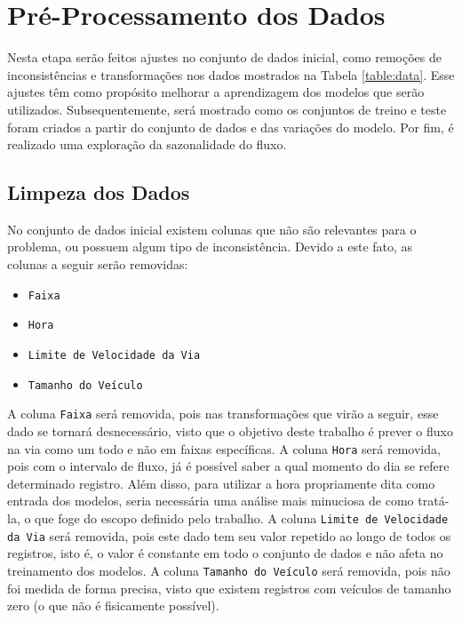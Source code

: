 \section{Pré-Processamento dos Dados}

Nesta etapa serão feitos ajustes no conjunto de dados inicial, como remoções de inconsistências e transformações nos dados mostrados na Tabela \ref{table:data}. Esse ajustes têm como propósito melhorar a aprendizagem dos modelos que serão utilizados. Subsequentemente, será mostrado como os conjuntos de treino e teste foram criados a partir do conjunto de dados e das variações do modelo. Por fim, é realizado uma exploração da sazonalidade do fluxo.

\subsection{Limpeza dos Dados}

No conjunto de dados inicial existem colunas que não são relevantes para o problema, ou possuem algum tipo de inconsistência. Devido a este fato, as colunas a seguir serão removidas:

\begin{itemize}
    \item \texttt{Faixa}
    \item  \texttt{Hora}
    \item \texttt{Limite de Velocidade da Via}
    \item  \texttt{Tamanho do Veículo}
\end{itemize}

A coluna \texttt{Faixa} será removida, pois nas transformações que virão a seguir, esse dado se tornará desnecessário, visto que o objetivo deste trabalho é prever o fluxo na via como um todo e não em faixas específicas. A coluna \texttt{Hora} será removida, pois com o intervalo de fluxo, já é possível saber a qual momento do dia se refere determinado registro. Além disso, para utilizar a hora propriamente dita como entrada dos modelos, seria necessária uma análise mais minuciosa de como tratá-la, o que foge do escopo definido pelo trabalho. A coluna \texttt{Limite de Velocidade da Via} será removida, pois este dado tem seu valor repetido ao longo de todos os registros, isto é, o valor é constante em todo o conjunto de dados e não afeta no treinamento dos modelos. A coluna \texttt{Tamanho do Veículo} será removida, pois não foi medida de forma precisa, visto que existem registros com veículos de tamanho zero (o que não é fisicamente possível).

